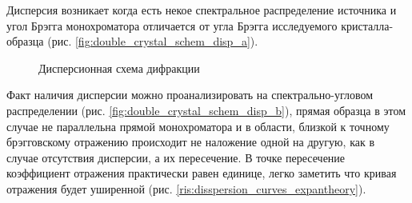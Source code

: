 \label{sec:dispersion_cal_an_exp}
  Дисперсия возникает когда есть некое спектральное распределение источника и
   угол Брэгга монохроматора отличается от угла Брэгга исследуемого кристалла-образца
   (рис. \ref{fig:double_crystal_schem_disp_a}).
  \begin{figure}[H]
    \centering
    \hfill
    \caption{Дисперсионная схема дифракции}
    \label{ris:double_crystal_schem_disp}
  \end{figure}
  Факт наличия дисперсии можно проанализировать на спектрально-угловом распределении
  (рис. \ref{fig:double_crystal_schem_disp_b}), прямая образца в этом случае не параллельна прямой монохроматора и
  в области, близкой к точному брэгговскому отражению происходит не наложение одной на другую, как в случае отсутствия дисперсии,
  а их пересечение. В точке пересечение коэффициент отражения практически равен единице,
  легко заметить что кривая отражения будет уширенной (рис. \ref{ris:disspersion_curves_expantheory}).
